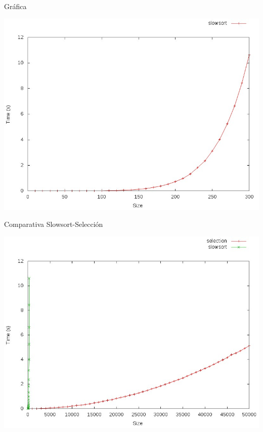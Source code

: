 \documentclass[compress]{beamer}
\begin{document}
\begin{frame}{Gráfica}
	\begin{alertblock}{}
		\begin{center}
		\includegraphics[scale=0.40]{images/slowsort.jpeg}
		\end{center}
	\end{alertblock}
\end{frame}

\begin{frame}{Comparativa Slowsort-Selección}
	\begin{alertblock}{}
		\begin{center}
		\includegraphics[scale=0.40]{images/sele-slow.jpeg}
		\end{center}
	\end{alertblock}
\end{frame}
\end{document}
